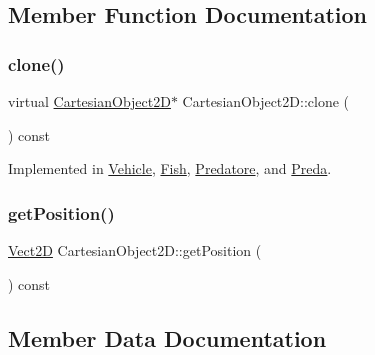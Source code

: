 \subsection{Member Function Documentation}
\mbox{\label{classCartesianObject2D_afd883b92328b20defd9ed7af581206ab_afd883b92328b20defd9ed7af581206ab}} 
\subsubsection{\texorpdfstring{clone()}{clone()}}
{\footnotesize\ttfamily virtual \hyperlink{classCartesianObject2D}{Cartesian\+Object2D}$\ast$ Cartesian\+Object2\+D\+::clone (\begin{DoxyParamCaption}{ }\end{DoxyParamCaption}) const\hspace{0.3cm}{\ttfamily [pure virtual]}}



Implemented in \hyperlink{classVehicle_a6c8513134608499d188a2e994accdb7c_a6c8513134608499d188a2e994accdb7c}{Vehicle}, \hyperlink{classFish_a6732945f7373a28b1723e55de8a65e13_a6732945f7373a28b1723e55de8a65e13}{Fish}, \hyperlink{classPredatore_a493b41e7df1542c10cdd646559514917_a493b41e7df1542c10cdd646559514917}{Predatore}, and \hyperlink{classPreda_a12baf94e52873bf3b9a9a9da84c357c5_a12baf94e52873bf3b9a9a9da84c357c5}{Preda}.

\mbox{\label{classCartesianObject2D_aa3a6b63777852ab9eb9408ed2536abe2_aa3a6b63777852ab9eb9408ed2536abe2}} 
\subsubsection{\texorpdfstring{get\+Position()}{getPosition()}}
{\footnotesize\ttfamily \hyperlink{classVect2D}{Vect2D} Cartesian\+Object2\+D\+::get\+Position (\begin{DoxyParamCaption}{ }\end{DoxyParamCaption}) const}



\subsection{Member Data Documentation}
\mbox{\label{classCartesianObject2D_ae02ec6ed11f9bfc0c748da033d6a32f9_ae02ec6ed11f9bfc0c748da033d6a32f9}} 
